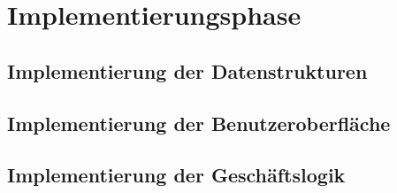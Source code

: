 
\section{Implementierungsphase}
\blindtext
\subsection{Implementierung der Datenstrukturen}
\subsection{Implementierung der Benutzeroberfläche}
\subsection{Implementierung der Geschäftslogik}